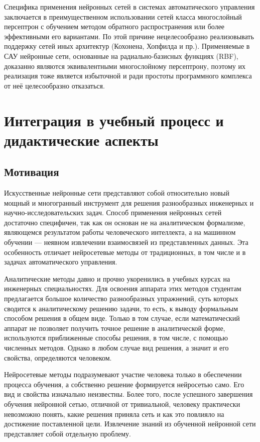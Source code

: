 Специфика применения нейронных сетей в системах автоматического
управления заключается в преимущественном использовании сетей класса
многослойный персептрон с обучением методом обратного распространения
или более эффективными его вариантами.  По этой причине
нецелесообразно реализовывать поддержку сетей иных архитектур
(Кохонена, Хопфилда и пр.).  Применяемые в САУ нейронные сети,
основанные на радиально-базисных функциях (RBF), доказанно являются
эквивалентными многослойному персептрону, поэтому их реализация тоже
является избыточной и ради простоты программного комплекса от неё
целесообразно отказаться.

\section{Интеграция в учебный процесс и дидактические аспекты}

\subsection{Мотивация}


Искусственные нейронные сети представляют собой относительно новый
мощный и многогранный инструмент для решения разнообразных инженерных
и научно-исследовательских задач.  Способ применения нейронных сетей
достаточно специфичен, так как он основан не на аналитическом
формализме, являющемся результатом работы человеческого интеллекта, а
на машинном обучении --- неявном извлечении взаимосвязей из
представленных данных.  Эта особенность отличает нейросетевые методы
от традиционных, в том числе и в задачах автоматического управления.

Аналитические методы давно и прочно укоренились в учебных курсах на
инженерных специальностях.  Для освоения аппарата этих методов
студентам предлагается большое количество разнообразных упражнений,
суть которых сводится к аналитическому решению задачи, то есть, к
выводу формальным способом решения в общем виде.  Только в том случае,
если математический аппарат не позволяет получить точное решение в
аналитической форме, используются приближенные способы решения, в том
числе, с помощью численных методов.  Однако в любом случае вид
решения, а значит и его свойства, определяются человеком.

Нейросетевые методы подразумевают участие человека только в
обеспечении процесса обучения, а собственно решение формируется
нейросетью само.  Его вид и свойства изначально неизвестны.  Более
того, после успешного завершения обучения нейронной сетью, отличной от
тривиальной, человеку практически невозможно понять, какие решения
приняла сеть и как это повлияло на достижение поставленной цели.
Извлечение знаний из обученной нейронной сети представляет собой
отдельную проблему.

